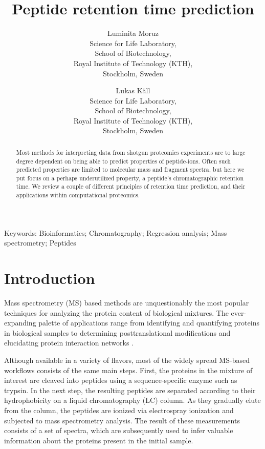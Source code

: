 \documentclass[a4paper]{article}
\title{Peptide retention time prediction}
\author{
Luminita Moruz\\
Science for Life Laboratory,\\
School of Biotechnology,\\
Royal Institute of Technology (KTH),\\
Stockholm, Sweden
\and
Lukas K\"{a}ll\\
Science for Life Laboratory,\\
School of Biotechnology,\\
Royal Institute of Technology (KTH),\\
Stockholm, Sweden}
\begin{document}
\maketitle

\setcounter{secnumdepth}{2} %
\setcounter{tocdepth}{2}    %
\tableofcontents            %

\setlength{\parskip}{0.15cm}

\begin{abstract}
Most methods for interpreting data from shotgun proteomics experiments
are to large degree dependent on being able to predict properties of
peptide-ions. Often such predicted properties are limited to molecular
mass and fragment spectra, but here we put focus on a perhaps
underutilized property, a peptide's chromatographic retention time. We
review a couple of different principles of retention time prediction,
and their applications within computational proteomics.
\end{abstract}

Keywords: Bioinformatics; Chromatography; Regression analysis; Mass spectrometry; Peptides

\section{Introduction}

Mass spectrometry (MS) based methods are unquestionably the most
popular techniques for analyzing the protein content of biological
mixtures.  The ever-expanding palette of applications range from
identifying and quantifying proteins in biological samples
\cite{Geiger2012} to determining posttranslational modifications
\cite{Huttlin2010} and elucidating protein interaction networks
\cite{Gavin2011}.

Although available in a variety of flavors, most of the widely spread
MS-based workflows consists of the same main steps. First, the
proteins in the mixture of interest are cleaved into peptides using a
sequence-specific enzyme such as trypsin. In the next step, the
resulting peptides are separated according to their hydrophobicity on
a liquid chromatography (LC) column. As they gradually elute from the
column, the peptides are ionized via electrospray ionization and
subjected to mass spectrometry analysis. The result of these
measurements consists of a set of spectra, which are subsequently used
to infer valuable information about the proteins present in the
initial sample.
\end{document}
